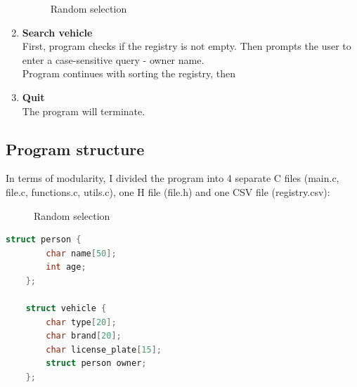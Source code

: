 \documentclass[12pt, a4paper, openright]{article}
\begin{document}
\begin{enumerate}
      \begin{figure}[h!]
        \centering
        \caption{Random selection}
        \label{fig:placeholder}
    \end{figure}

  \item \textbf{Search vehicle} \\
    First, program checks if the registry is not empty. Then prompts the user to enter a case-sensitive query - owner name.\\

    Program continues with sorting the registry, then

  \item \textbf{Quit} \\
  The program will terminate.
\end{enumerate}

\subsection*{Program structure}

In terms of modularity, I divided the program into 4 separate C files (main.c, file.c, functions.c, utils.c), one H file (file.h) and one CSV file (registry.csv):

      \begin{figure}[h!]
        \centering
        \caption{Random selection}
        \label{fig:placeholder}
    \end{figure}

    \begin{lstlisting}[language=C, caption={Definition of structs}]
    struct person {
        char name[50];
        int age;
    };
    
    struct vehicle {
        char type[20];
        char brand[20];
        char license_plate[15];
        struct person owner;
    };
    \end{lstlisting}
\end{document}

